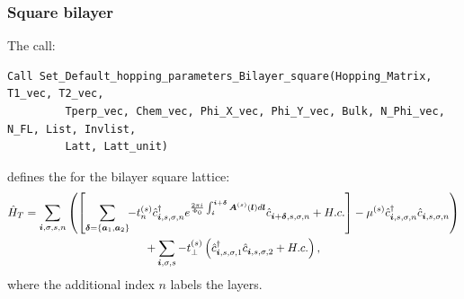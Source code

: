 \subsubsection*{Square bilayer}
The call:
 \begin{lstlisting}[style=fortran]
Call Set_Default_hopping_parameters_Bilayer_square(Hopping_Matrix, T1_vec, T2_vec,
         Tperp_vec, Chem_vec, Phi_X_vec, Phi_Y_vec, Bulk, N_Phi_vec, N_FL, List, Invlist,
         Latt, Latt_unit)
\end{lstlisting}  
defines  the   for the  bilayer  square  lattice:       
\begin{multline}
\hat{H}_T  =    \sum_{\boldsymbol{i}, \sigma, s,n } \left(    \left[  \sum_{ \boldsymbol{\delta} = \left\{ \boldsymbol{a}_1, \boldsymbol{a}_2\right\} } \!\! - t_n^{(s)} \hat{c}^{\dagger}_{\boldsymbol{i},s,\sigma,n}   e^{\frac{2 \pi i}{\Phi_0} \int_{\boldsymbol{i}}^{\boldsymbol{i}+ \boldsymbol{\delta}}  \boldsymbol{A}^{(s)}(\boldsymbol{l})  d \boldsymbol{l}}   \hat{c}^{}_{\boldsymbol{i} + \boldsymbol{\delta},s,\sigma,n} +  H.c. \right]       -  \mu^{(s)} \hat{c}^{\dagger}_{\boldsymbol{i},s,\sigma,n} \hat{c}^{}_{\boldsymbol{i},s,\sigma,n}  \right)   \\
     + \sum_{\boldsymbol{i}, \sigma, s } -  t_{\perp}^{(s)}  \left( \hat{c}^{\dagger}_{\boldsymbol{i},s,\sigma,1} \hat{c}^{}_{\boldsymbol{i},s,\sigma,2}    + H.c.  \right), 
\end{multline}
where the additional  index  $n$  labels the layers.


